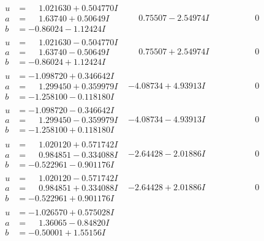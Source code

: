 \documentclass[1p]{elsarticle_modified}
\theoremstyle{definition}
\begin{document}
$$\begin{array}{c|c|c}
\begin{aligned}
u &= \phantom{-}1.021630 + 0.504770 I \\
a &= \phantom{-}1.63740 + 0.50649 I \\
b &= -0.86024 - 1.12424 I\end{aligned}
 & \phantom{-}0.75507 - 2.54974 I & \phantom{-0.000000 } 0 \\ \hline\begin{aligned}
u &= \phantom{-}1.021630 - 0.504770 I \\
a &= \phantom{-}1.63740 - 0.50649 I \\
b &= -0.86024 + 1.12424 I\end{aligned}
 & \phantom{-}0.75507 + 2.54974 I & \phantom{-0.000000 } 0 \\ \hline\begin{aligned}
u &= -1.098720 + 0.346642 I \\
a &= \phantom{-}1.299450 + 0.359979 I \\
b &= -1.258100 - 0.118180 I\end{aligned}
 & -4.08734 + 4.93913 I & \phantom{-0.000000 } 0 \\ \hline\begin{aligned}
u &= -1.098720 - 0.346642 I \\
a &= \phantom{-}1.299450 - 0.359979 I \\
b &= -1.258100 + 0.118180 I\end{aligned}
 & -4.08734 - 4.93913 I & \phantom{-0.000000 } 0 \\ \hline\begin{aligned}
u &= \phantom{-}1.020120 + 0.571742 I \\
a &= \phantom{-}0.984851 - 0.334088 I \\
b &= -0.522961 - 0.901176 I\end{aligned}
 & -2.64428 - 2.01886 I & \phantom{-0.000000 } 0 \\ \hline\begin{aligned}
u &= \phantom{-}1.020120 - 0.571742 I \\
a &= \phantom{-}0.984851 + 0.334088 I \\
b &= -0.522961 + 0.901176 I\end{aligned}
 & -2.64428 + 2.01886 I & \phantom{-0.000000 } 0 \\ \hline\begin{aligned}
u &= -1.026570 + 0.575028 I \\
a &= \phantom{-}1.36065 - 0.84820 I \\
b &= -0.50001 + 1.55156 I\end{aligned}

\end{array}$$
\end{document}
